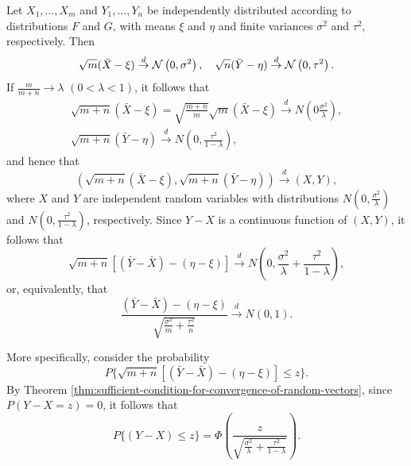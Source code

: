 \begin{example}[Multinomial]

\end{example}

\begin{example}
	Let $X_{1},\ldots,X_m$ and $Y_{1},\ldots,Y_n$ be independently distributed according to distributions $F$ and $G$, with means $\xi$ and $\eta$ and finite variances $\sigma^2$ and $\tau^2$, respectively. Then
	\begin{equation*}
		\sqrt{m}(\bar{X}-\xi)\stackrel{d}{\rightarrow}{\mathcal N}\left(0,\sigma^2\right),\quad\sqrt{n}(\bar{Y}-\eta)\stackrel{d}{\rightarrow}{\mathcal N}\left(0,\tau^2\right).
	\end{equation*}
	If $\frac{m}{m+n} \rightarrow \lambda$ $(0<\lambda<1)$, it follows that
	\begin{gather*}
		\sqrt{m+n}(\bar{X}-\xi)=\sqrt{\frac{m+n}{m}}\sqrt{m}(\bar{X}-\xi)\stackrel{d}{\rightarrow}N\left(0\frac{\sigma^2}{\lambda}\right),\\
		\sqrt{m+n}(\bar{Y}-\eta)\stackrel{d}{\rightarrow}N\left(0,\frac{\tau^2}{1-\lambda}\right),
	\end{gather*}
	and hence that
	\begin{equation*}
		(\sqrt{m+n}(\bar{X}-\xi),\sqrt{m+n}(\bar{Y}-\eta)) \stackrel{d}{\rightarrow}(X,Y),
	\end{equation*}
	where $X$ and $Y$ are independent random variables with distributions $N\left(0, \frac{\sigma^2}{\lambda}\right)$ and $N\left(0, \frac{\tau^2}{1-\lambda}\right)$, respectively.
	Since $Y-X$ is a continuous function of $(X, Y)$, it follows that
	\begin{equation*}
		\sqrt{m+n}[(\bar{Y}-\bar{X})-(\eta-\xi)]\stackrel{d}{\rightarrow}N\left(0,\frac{\sigma^2}{\lambda}+\frac{\tau^2}{1-\lambda}\right),
	\end{equation*}
	or, equivalently, that
	\begin{equation*}
		\frac{(\bar{Y}-\bar{X})-(\eta-\xi)}{\sqrt{\frac{\sigma^2}{m}+\frac{\tau^2}{n}}}\stackrel{d}{\rightarrow}N(0,1).
	\end{equation*}

	More specifically, consider the probability
	\begin{equation*}
		P\{\sqrt{m+n}[(\bar{Y}-\bar{X})-(\eta-\xi)]\leq z\}.
	\end{equation*}
	By Theorem \ref{thm:sufficient-condition-for-convergence-of-random-vectors}, since $P(Y-X=z)=0$, it follows that
	\begin{equation*}
		P\{(Y-X) \leq z\}=\Phi\left(\frac{z}{\sqrt{\frac{\sigma^2}{\lambda}+\frac{\tau^2}{1-\lambda}}}\right).
	\end{equation*}
\end{example}

